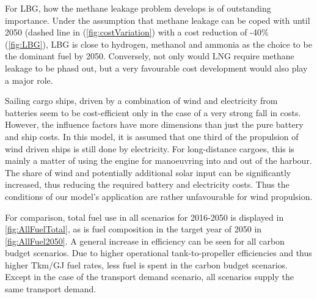 \documentclass[article]{elsarticle}
\begin{document}
For LBG, how the methane leakage problem develops is of outstanding importance. Under the assumption that methane leakage can be coped with until 2050 (dashed line in (\autoref{fig:costVariation}) with a cost reduction of -40\% (\autoref{fig:LBG}), LBG is close to hydrogen, methanol and ammonia as the choice to be the dominant fuel by 2050. Conversely, not only would LNG require methane leakage to be phasd out, but a very favourable cost development would also play a major role.

Sailing cargo ships, driven by a combination of wind and electricity from batteries seem to be cost-efficient only in the case of a very strong fall in costs. However, the influence factors have more dimensions than just the pure battery and ship costs. In this model, it is assumed that one third of the propulsion of wind driven ships is still done by electricity. For long-distance cargoes, this is mainly a matter of using the engine for manoeuvring into and out of the harbour. The share of wind and potentially additional solar input can be significantly increased, thus reducing the required battery and electricity costs. Thus the conditions of our model's application are rather unfavourable for wind propulsion.

For comparison, total fuel use in all scenarios for 2016-2050 is displayed in \autoref{fig:AllFuelTotal}, as is fuel composition in the target year of 2050 in \autoref{fig:AllFuel2050}. A general increase in efficiency can be seen for all carbon budget scenarios. Due to higher operational tank-to-propeller efficiencies and thus higher Tkm/GJ fuel rates, less fuel is spent in the carbon budget scenarios. Except in the case of the transport demand scenario, all scenarios supply the same transport demand.
\end{document}
